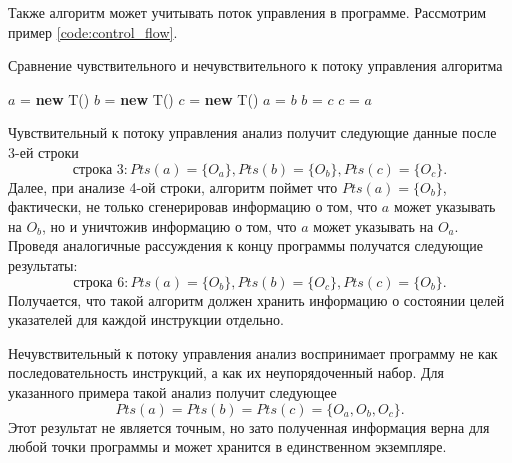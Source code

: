\documentclass[14pt,titlepage]{extarticle}
\newcommand{\NEW}{\textbf{new }}
\newenvironment{fresh}{\color{Blue}}{\color{black}}
\begin{document}
    \begin{fresh}

    Также алгоритм может учитывать поток управления в программе. Рассмотрим
    пример \ref{code:control_flow}.
    \begin{algorithm}
      \caption{Сравнение чувствительного и нечувствительного к потоку
               управления алгоритма}
      \label{code:control_flow}
      \begin{algorithmic}[1]
        \STATE $a$ = \NEW T()
        \STATE $b$ = \NEW T()
        \STATE $c$ = \NEW T()
        \STATE $a$ = $b$
        \STATE $b$ = $c$
        \STATE $c$ = $a$
      \end{algorithmic}
    \end{algorithm}
    Чувствительный к потоку управления анализ получит следующие данные после
    3-ей строки
    \[\textrm{строка 3}:
        Pts(a) = \{O_a\}, Pts(b) = \{O_b\}, Pts(c) = \{O_c\}.\]
    Далее, при анализе 4-ой строки, алгоритм поймет что $Pts(a) = \{O_b\}$,
    фактически, не только сгенерировав информацию о том, что $a$ может
    указывать на $O_b$, но и уничтожив информацию о том, что $a$ может
    указывать на $O_a$.
    Проведя аналогичные рассуждения к концу программы получатся следующие
    результаты:
    \[\textrm{строка 6}:
        Pts(a) = \{O_b\}, Pts(b) = \{O_c\}, Pts(c) = \{O_b\}.\]
    Получается, что такой алгоритм должен хранить информацию о состоянии целей
    указателей для каждой инструкции отдельно.

    Нечувствительный к потоку управления анализ воспринимает программу не как
    последовательность инструкций, а как их неупорядоченный набор.
    Для указанного примера такой анализ получит следующее
    \[Pts(a) = Pts(b) = Pts(c) = \{O_a, O_b, O_c\}.\]
    Этот результат не является точным, но зато полученная информация верна для
    любой точки программы и может хранится в единственном экземпляре.

    \end{fresh}
\end{document}
